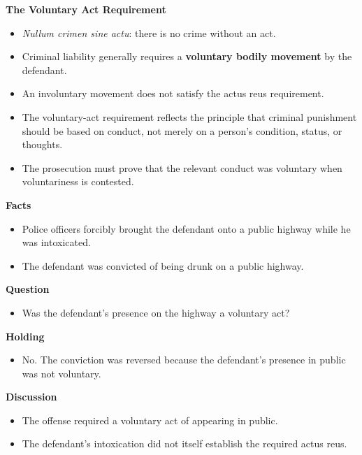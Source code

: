 \documentclass[11pt]{tex/lawoutline}
\begin{document}
\textbf{The Voluntary Act Requirement}
\begin{itemize}
    \item \textit{Nullum crimen sine actu}: there is no crime without an act.
    \item Criminal liability generally requires a \textbf{voluntary bodily movement} by the defendant.
    \item An involuntary movement does not satisfy the actus reus requirement.
    \item The voluntary-act requirement reflects the principle that criminal punishment should be based on conduct, not merely on a person's condition, status, or thoughts.
    \item The prosecution must prove that the relevant conduct was voluntary when voluntariness is contested.
\end{itemize}


{}
{
\textbf{Facts}
\begin{itemize}
    \item Police officers forcibly brought the defendant onto a public highway while he was intoxicated.
    \item The defendant was convicted of being drunk on a public highway.
\end{itemize}

\textbf{Question}
\begin{itemize}
    \item Was the defendant's presence on the highway a voluntary act?
\end{itemize}

\textbf{Holding}
\begin{itemize}
    \item No. The conviction was reversed because the defendant's presence in public was not voluntary.
\end{itemize}

\textbf{Discussion}
\begin{itemize}
    \item The offense required a voluntary act of appearing in public.
    \item The defendant's intoxication did not itself establish the required actus reus.
\end{itemize}
}
\end{document}
